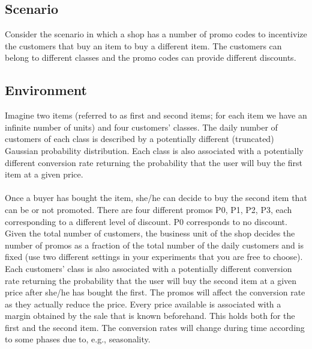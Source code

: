 \subsection{Scenario}
 Consider the scenario in which a shop has a number of promo codes to incentivize the customers that buy an item to buy a different item. The customers can belong to different classes and the promo codes can provide different discounts. 
\subsection{Environment}
 Imagine two items (referred to as first and second items; for each item we have an infinite number of units) and four customers’ classes. The daily number of customers of each class is described by a potentially different (truncated) Gaussian probability distribution. Each class is also associated with a potentially different conversion rate returning the probability that the user will buy the first item at a given price.
\paragraph{}
Once a buyer has bought the item, she/he can decide to buy the second item that can be or not promoted. There are four different promos P0, P1, P2, P3, each corresponding to a different level of discount. P0 corresponds to no discount. Given the total number of customers, the business unit of the shop decides the number of promos as a fraction of the total number of the daily customers and is fixed (use two different settings in your experiments that you are free to choose). Each customers’ class is also associated with a potentially different conversion rate returning the probability that the user will buy the second item at a given price after she/he has bought the first. The promos will affect the conversion rate as they actually reduce the price. 
Every price available is associated with a margin obtained by the sale that is known beforehand. This holds both for the first and the second item. 
The conversion rates will change during time according to some phases due to, e.g., seasonality.
